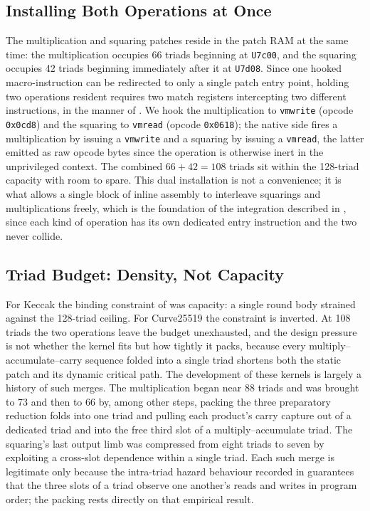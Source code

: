 \subsection{Installing Both Operations at Once}
\label{sec:c25519-coexist}

The multiplication and squaring patches reside in the patch RAM at the same time:
the multiplication occupies 66 triads beginning at \texttt{U7c00}, and the squaring
occupies 42 triads beginning immediately after it at \texttt{U7d08}. Since one
hooked macro-instruction can be redirected to only a single patch entry point,
holding two operations resident requires two match registers intercepting two
different instructions, in the manner of . We hook the
multiplication to \texttt{vmwrite} (opcode \texttt{0x0cd8}) and the squaring to
\texttt{vmread} (opcode \texttt{0x0618}); the native side fires a multiplication by
issuing a \texttt{vmwrite} and a squaring by issuing a \texttt{vmread}, the latter
emitted as raw opcode bytes since the operation is otherwise inert in the
unprivileged context. The combined $66+42 = 108$ triads sit within the 128-triad
capacity with room to spare. This dual installation is not a convenience; it is
what allows a single block of inline assembly to interleave squarings and
multiplications freely, which is the foundation of the integration described in
, since each kind of operation has its own dedicated
entry instruction and the two never collide.

\subsection{Triad Budget: Density, Not Capacity}
\label{sec:c25519-budget}

For Keccak the binding constraint of  was capacity: a single
round body strained against the 128-triad ceiling. For Curve25519 the constraint
is inverted. At 108 triads the two operations leave the budget unexhausted, and
the design pressure is not whether the kernel fits but how tightly it packs,
because every multiply--accumulate--carry sequence folded into a single triad
shortens both the static patch and its dynamic critical path. The development of
these kernels is largely a history of such merges. The multiplication began near
88 triads and was brought to 73 and then to 66 by, among other steps, packing the
three preparatory reduction folds into one triad and pulling each product's carry
capture out of a dedicated triad and into the free third slot of a
multiply--accumulate triad. The squaring's last output limb was compressed from
eight triads to seven by exploiting a cross-slot dependence within a single triad.
Each such merge is legitimate only because the intra-triad hazard behaviour
recorded in  guarantees that the three slots of a triad observe
one another's reads and writes in program order; the packing rests directly on
that empirical result.

